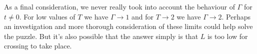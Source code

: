 \documentclass[reprint,english,notitlepage,aps,nobalancelastpage,nofootinbib]{revtex4-1}
\begin{document}
As a final consideration, we never really took into account the behaviour of $\Gamma$ for $t\neq0$. For low values of $T$ we have $\Gamma\to1$ and for $T\to2$ we have $\Gamma\to2$. Perhaps an investigation and more thorough consideration of these limits could help solve the puzzle. But it's also possible that the answer simply is that $L$ is too low for crossing to take place.    
\end{document}
